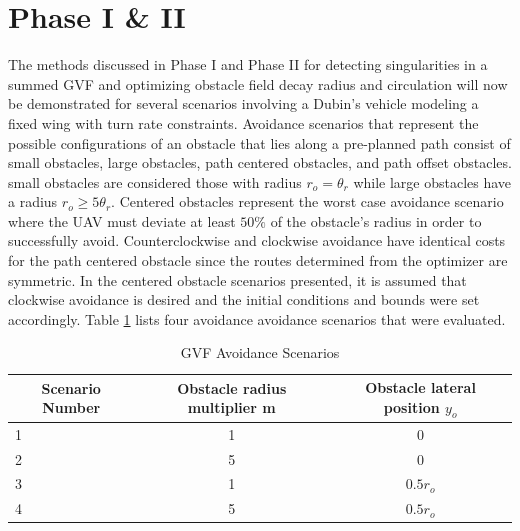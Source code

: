 \documentclass[numbered,pdftex]{ohio-etd}
\begin{document}
\section{Phase I \& II}

The methods discussed in Phase I and Phase II for detecting singularities in a summed GVF and optimizing obstacle field decay radius and circulation will now be demonstrated for several scenarios involving a Dubin's vehicle modeling a fixed wing with turn rate constraints. Avoidance scenarios that represent the possible configurations of an obstacle that lies along a pre-planned path consist of small obstacles, large obstacles, path centered obstacles, and path offset obstacles. small obstacles are considered those with radius $r_o = \theta_r$ while large obstacles have a radius $r_o\ge5\theta_r$. Centered obstacles represent the worst case avoidance scenario where the UAV must deviate at least $50\%$ of the obstacle's radius in order to successfully avoid. Counterclockwise and clockwise avoidance have identical costs for the path centered obstacle since the routes determined from the optimizer are symmetric. In the centered obstacle scenarios presented, it is assumed that clockwise avoidance is desired and the initial conditions and bounds were set accordingly. Table \ref{table:avoidanceScenarios} lists four avoidance avoidance scenarios that were evaluated.


\begin{table}[]
	\centering
	\caption{GVF Avoidance Scenarios}
	\label{table:avoidanceScenarios}
	\begin{tabular}{|l|c|c|}
		\hline
		\multicolumn{1}{|c|}{Scenario Number} & Obstacle radius multiplier m & Obstacle lateral position $y_o$    \\ \hline
		1                                     & 1 & 0     \\ \hline
		2                                     & 5 & 0     \\ \hline
		3                                     & 1 & $0.5r_o$ \\ \hline
		4                                     & 5 & $0.5r_o$ \\ \hline
	\end{tabular}
\end{table}
\end{document}
